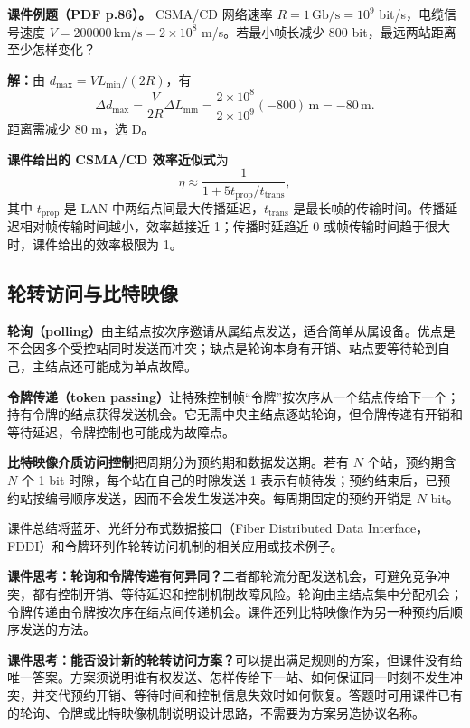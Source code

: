 \textbf{课件例题（PDF p.86）。} CSMA/CD 网络速率 $R=1\,\mathrm{Gb/s}=10^9$ bit/s，电缆信号速度 $V=200000\,\mathrm{km/s}=2\times10^8$ m/s。若最小帧长减少 800 bit，最远两站距离至少怎样变化？

\textbf{解：}由 $d_{\max}=VL_{\min}/(2R)$，有
\[
 \Delta d_{\max}=\frac{V}{2R}\Delta L_{\min}
 =\frac{2\times10^8}{2\times10^9}(-800)\,\mathrm{m}
 =-80\,\mathrm{m}.
\]
距离需减少 80 m，选 D。


\textbf{课件给出的 CSMA/CD 效率近似式}为
\[
 \eta\approx\frac{1}{1+5t_{\mathrm{prop}}/t_{\mathrm{trans}}},
\]
其中 $t_{\mathrm{prop}}$ 是 LAN 中两结点间最大传播延迟，$t_{\mathrm{trans}}$ 是最长帧的传输时间。传播延迟相对帧传输时间越小，效率越接近 1；传播时延趋近 0 或帧传输时间趋于很大时，课件给出的效率极限为 1。


\subsection{轮转访问与比特映像}
\textbf{轮询（polling）}由主结点按次序邀请从属结点发送，适合简单从属设备。优点是不会因多个受控站同时发送而冲突；缺点是轮询本身有开销、站点要等待轮到自己，主结点还可能成为单点故障。

\textbf{令牌传递（token passing）}让特殊控制帧“令牌”按次序从一个结点传给下一个；持有令牌的结点获得发送机会。它无需中央主结点逐站轮询，但令牌传递有开销和等待延迟，令牌控制也可能成为故障点。

\textbf{比特映像介质访问控制}把周期分为预约期和数据发送期。若有 $N$ 个站，预约期含 $N$ 个 1 bit 时隙，每个站在自己的时隙发送 1 表示有帧待发；预约结束后，已预约站按编号顺序发送，因而不会发生发送冲突。每周期固定的预约开销是 $N$ bit。

课件总结将蓝牙、光纤分布式数据接口（Fiber Distributed Data Interface，FDDI）和令牌环列作轮转访问机制的相关应用或技术例子。

\textbf{课件思考：轮询和令牌传递有何异同？}二者都轮流分配发送机会，可避免竞争冲突，都有控制开销、等待延迟和控制机制故障风险。轮询由主结点集中分配机会；令牌传递由令牌按次序在结点间传递机会。课件还列比特映像作为另一种预约后顺序发送的方法。

\textbf{课件思考：能否设计新的轮转访问方案？}可以提出满足规则的方案，但课件没有给唯一答案。方案须说明谁有权发送、怎样传给下一站、如何保证同一时刻不发生冲突，并交代预约开销、等待时间和控制信息失效时如何恢复。答题时可用课件已有的轮询、令牌或比特映像机制说明设计思路，不需要为方案另造协议名称。

